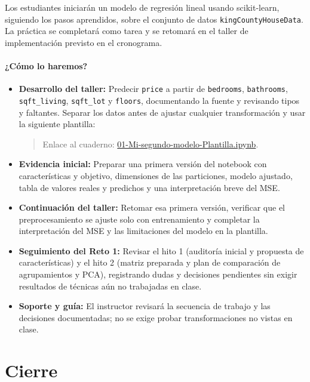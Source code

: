 \documentclass[a4,11pt]{aleph-notas}
\begin{document}
Los estudiantes iniciarán un modelo de regresión lineal usando scikit-learn, siguiendo los pasos aprendidos, sobre el conjunto de datos \texttt{kingCountyHouseData}. La práctica se completará como tarea y se retomará en el taller de implementación previsto en el cronograma.

\paragraph{¿Cómo lo haremos?}
\begin{itemize}[leftmargin=*]
    \item \textbf{Desarrollo del taller:} Predecir \texttt{price} a partir de \texttt{bedrooms}, \texttt{bathrooms}, \texttt{sqft\_living}, \texttt{sqft\_lot} y \texttt{floors}, documentando la fuente y revisando tipos y faltantes. Separar los datos antes de ajustar cualquier transformación y usar la siguiente plantilla:
    \begin{quote}
    Enlace al cuaderno: \href{https://colab.research.google.com/github/andres-merino/AprendizajeAutomaticoInicial-05-N0105/blob/main/2-Ejercicios/01-Mi-segundo-modelo-Plantilla.ipynb}{01-Mi-segundo-modelo-Plantilla.ipynb}.
    \end{quote}
    \item \textbf{Evidencia inicial:} Preparar una primera versión del notebook con características y objetivo, dimensiones de las particiones, modelo ajustado, tabla de valores reales y predichos y una interpretación breve del MSE.
    \item \textbf{Continuación del taller:} Retomar esa primera versión, verificar que el preprocesamiento se ajuste solo con entrenamiento y completar la interpretación del MSE y las limitaciones del modelo en la plantilla.
    \item \textbf{Seguimiento del Reto 1:} Revisar el hito 1 (auditoría inicial y propuesta de características) y el hito 2 (matriz preparada y plan de comparación de agrupamientos y PCA), registrando dudas y decisiones pendientes sin exigir resultados de técnicas aún no trabajadas en clase.
    \item \textbf{Soporte y guía:} El instructor revisará la secuencia de trabajo y las decisiones documentadas; no se exige probar transformaciones no vistas en clase.
\end{itemize}

\section*{Cierre}
\end{document}
